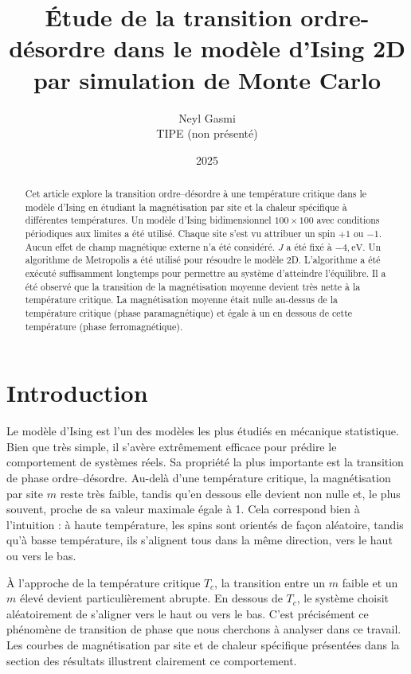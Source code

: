 \documentclass[a4paper,11pt]{article}
\title{Étude de la transition ordre-désordre dans le modèle d’Ising 2D par simulation de Monte Carlo}
\author{Neyl Gasmi \\ TIPE (non présenté)}
\date{2025}
\begin{document}
\maketitle

\begin{abstract}
Cet article explore la transition ordre–désordre à une température critique dans le modèle d’Ising en étudiant la magnétisation par site et la chaleur spécifique à différentes températures. Un modèle d’Ising bidimensionnel $100 \times 100$ avec conditions périodiques aux limites a été utilisé. Chaque site s’est vu attribuer un spin $+1$ ou $-1$. Aucun effet de champ magnétique externe n’a été considéré. $J$ a été fixé à $-4 ,\text{eV}$. Un algorithme de Metropolis a été utilisé pour résoudre le modèle 2D. L’algorithme a été exécuté suffisamment longtemps pour permettre au système d’atteindre l’équilibre. Il a été observé que la transition de la magnétisation moyenne devient très nette à la température critique. La magnétisation moyenne était nulle au-dessus de la température critique (phase paramagnétique) et égale à un en dessous de cette température (phase ferromagnétique).
\end{abstract}

\section{Introduction}
Le modèle d’Ising est l’un des modèles les plus étudiés en mécanique statistique. Bien que très simple, il s’avère extrêmement efficace pour prédire le comportement de systèmes réels. Sa propriété la plus importante est la transition de phase ordre–désordre. Au-delà d’une température critique, la magnétisation par site $m$ reste très faible, tandis qu’en dessous elle devient non nulle et, le plus souvent, proche de sa valeur maximale égale à 1. Cela correspond bien à l’intuition : à haute température, les spins sont orientés de façon aléatoire, tandis qu’à basse température, ils s’alignent tous dans la même direction, vers le haut ou vers le bas.

À l’approche de la température critique $T_c$, la transition entre un $m$ faible et un $m$ élevé devient particulièrement abrupte. En dessous de $T_c$, le système choisit aléatoirement de s’aligner vers le haut ou vers le bas. C’est précisément ce phénomène de transition de phase que nous cherchons à analyser dans ce travail. Les courbes de magnétisation par site et de chaleur spécifique présentées dans la section des résultats illustrent clairement ce comportement.
\end{document}

